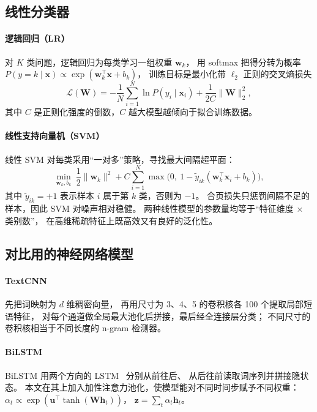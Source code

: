 \documentclass[11pt, a4paper]{ctexart}
\begin{document}
\subsection{线性分类器}

\paragraph{逻辑回归（LR）}
对 $K$ 类问题，逻辑回归为每类学习一组权重 $\mathbf{w}_k$，
用 softmax 把得分转为概率
$P(y=k\mid\mathbf{x}) \propto \exp(\mathbf{w}_k^{\top}\mathbf{x} + b_k)$，
训练目标是最小化带 $\ell_2$ 正则的交叉熵损失
\begin{equation}
  \mathcal{L}(\mathbf{W}) = -\frac{1}{N}\sum_{i=1}^{N} \ln P(y_i \mid \mathbf{x}_i)
  + \frac{1}{2C}\|\mathbf{W}\|_2^2 ,
\end{equation}
其中 $C$ 是正则化强度的倒数，$C$ 越大模型越倾向于拟合训练数据。

\paragraph{线性支持向量机（SVM）}
线性 SVM 对每类采用“一对多”策略，寻找最大间隔超平面：
\begin{equation}
  \min_{\mathbf{w}_k, b_k}\ \frac{1}{2}\|\mathbf{w}_k\|^2
  + C \sum_{i=1}^{N} \max\!\bigl(0,\ 1 - \tilde{y}_{ik}(\mathbf{w}_k^{\top}\mathbf{x}_i + b_k)\bigr),
\end{equation}
其中 $\tilde{y}_{ik}=+1$ 表示样本 $i$ 属于第 $k$ 类，否则为 $-1$。
合页损失只惩罚间隔不足的样本，因此 SVM 对噪声相对稳健。
两种线性模型的参数量均等于“特征维度 $\times$ 类别数”，
在高维稀疏特征上既高效又有良好的泛化性。

\subsection{对比用的神经网络模型}

\paragraph{TextCNN}
\citet{kim2014convolutional} 先把词映射为 $d$ 维稠密向量，
再用尺寸为 3、4、5 的卷积核各 100 个提取局部短语特征，
对每个通道做全局最大池化后拼接，最后经全连接层分类；
不同尺寸的卷积核相当于不同长度的 n-gram 检测器。

\paragraph{BiLSTM}
BiLSTM 用两个方向的 LSTM~\citep{hochreiter1997long} 分别从前往后、
从后往前读取词序列并拼接隐状态。
本文在其上加入加性注意力池化，使模型能对不同时间步赋予不同权重：
$\alpha_t \propto \exp(\mathbf{u}^{\top}\tanh(\mathbf{W}\mathbf{h}_t))$，
$\mathbf{z} = \sum_t \alpha_t \mathbf{h}_t$。
\end{document}
